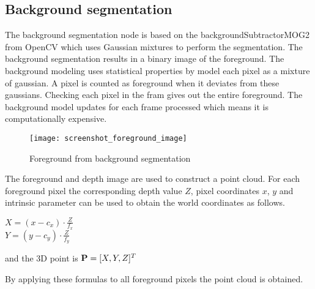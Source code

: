 
\subsection{Background segmentation}

The background segmentation node is based on the backgroundSubtractorMOG2 from OpenCV \cite{BGS} which uses Gaussian mixtures to perform the segmentation. The background segmentation results in a binary image of the foreground. The background modeling uses statistical properties by model each pixel as a mixture of gaussian. A pixel is counted as foreground when it deviates from these gaussians. Checking each pixel in the fram gives out the entire foreground. The background model updates for each frame processed which means it is computationally expensive. 

\begin{figure}[H]
\begin{center}
\texttt{[image: screenshot\_foreground\_image]}
\caption{Foreground from background segmentation}

\end{center}
\end{figure}


The foreground and depth image are used to construct a point cloud. For each foreground pixel the corresponding depth value $Z$, pixel coordinates $x$, $y$ and intrinsic parameter can be used to obtain the world coordinates as follows.

\begin{center}
$\displaystyle X = (x - c_x) \cdot \frac{Z}{f_x}$\\ \vspace{10 pt}
$\displaystyle Y = (y - c_y) \cdot \frac{Z}{f_y}$

and the 3D point is ${\bf P} = [X, Y, Z]^T$
\end{center}


By applying these formulas to all foreground pixels the point cloud is obtained.


